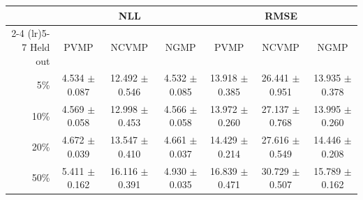 \begin{tabular}{rcccccc}
\toprule
 & \multicolumn{3}{c}{NLL} & \multicolumn{3}{c}{RMSE} \\
\cmidrule(lr){2-4} \cmidrule(lr){5-7}
Held out & PVMP & NCVMP & NGMP & PVMP & NCVMP & NGMP \\
\midrule
5\% & 4.534 $\pm$ 0.087 & 12.492 $\pm$ 0.546 & 4.532 $\pm$ 0.085 & 13.918 $\pm$ 0.385 & 26.441 $\pm$ 0.951 & 13.935 $\pm$ 0.378 \\
10\% & 4.569 $\pm$ 0.058 & 12.998 $\pm$ 0.453 & 4.566 $\pm$ 0.058 & 13.972 $\pm$ 0.260 & 27.137 $\pm$ 0.768 & 13.995 $\pm$ 0.260 \\
20\% & 4.672 $\pm$ 0.039 & 13.547 $\pm$ 0.410 & 4.661 $\pm$ 0.037 & 14.429 $\pm$ 0.214 & 27.616 $\pm$ 0.549 & 14.446 $\pm$ 0.208 \\
50\% & 5.411 $\pm$ 0.162 & 16.116 $\pm$ 0.391 & 4.930 $\pm$ 0.035 & 16.839 $\pm$ 0.471 & 30.729 $\pm$ 0.507 & 15.789 $\pm$ 0.162 \\
\bottomrule
\end{tabular}
